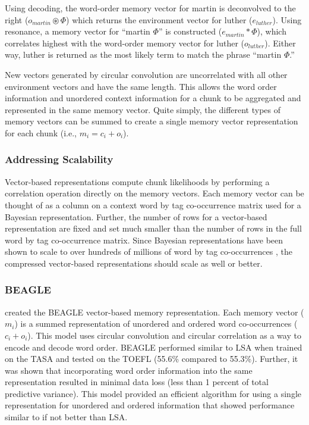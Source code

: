 \documentclass[man,floatsintext,donotrepeattitle]{apa6}
\begin{document}
Using decoding, the word-order memory vector for martin is deconvolved to the right ($o_{martin} \circledast \Phi$) which returns the environment vector for luther ($e_{luther}$).
Using resonance, a memory vector for ``martin $\Phi$'' is constructed ($e_{martin} * \Phi$), which correlates highest with the word-order memory vector for luther ($o_{luther}$).
Either way, luther is returned as the most likely term to match the phrase ``martin $\Phi$.''

New vectors generated by circular convolution are uncorrelated with all other environment vectors and have the same length.
This allows the word order information and unordered context information for a chunk to be aggregated and represented in the same memory vector.
Quite simply, the different types of memory vectors can be summed to create a single memory vector representation for each chunk (i.e., $m_{i} = c_{i} + o_{i}$).

\subsubsection{Addressing Scalability}

Vector-based representations compute chunk likelihoods by performing a correlation operation directly on the memory vectors.
Each memory vector can be thought of as a column on a context word by tag co-occurrence matrix used for a Bayesian representation.
Further, the number of rows for a vector-based representation are fixed and set much smaller than the number of rows in the full word by tag co-occurrence matrix.
Since Bayesian representations have been shown to scale to over hundreds of millions of word by tag co-occurrences \parencite{Stanley2013}, the compressed vector-based representations should scale as well or better.

\subsubsection{BEAGLE}

\textcite{Jones2007} created the BEAGLE vector-based memory representation.
Each memory vector ($m_{i}$) is a summed representation of unordered and ordered word co-occurrences ($c_{i} + o_{i}$).
This model uses circular convolution and circular correlation as a way to encode and decode word order.
BEAGLE performed similar to LSA when trained on the TASA and tested on the TOEFL (\num{55.6}\% compared to \num{55.3}\%).
Further, it was shown that incorporating word order information into the same representation resulted in minimal data loss (less than 1 percent of total predictive variance).
This model provided an efficient algorithm for using a single representation for unordered and ordered information that showed performance similar to if not better than LSA.
\end{document}
